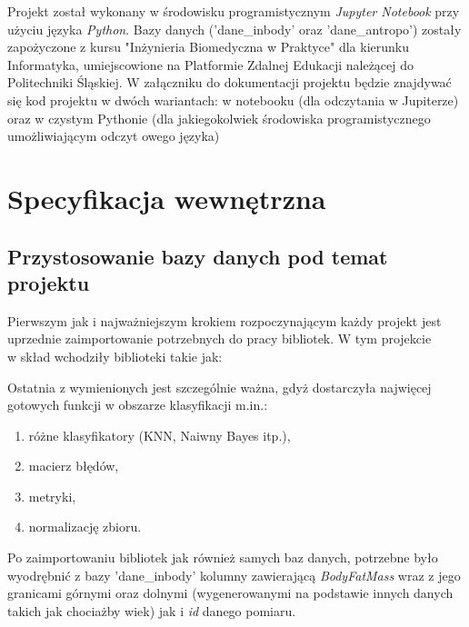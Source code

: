 \documentclass{article}
\begin{document}
Projekt został wykonany w środowisku programistycznym \textit{Jupyter Notebook} przy użyciu języka \textit{Python}. Bazy danych (\textsf{'dane\_inbody' oraz 'dane\_antropo'}) zostały zapożyczone z kursu "Inżynieria Biomedyczna w Praktyce" dla kierunku Informatyka, umiejscowione na Platformie Zdalnej Edukacji należącej do Politechniki Śląskiej. W załączniku do dokumentacji projektu będzie znajdywać się kod projektu w dwóch wariantach: w notebooku (dla odczytania w Jupiterze) oraz w czystym Pythonie (dla jakiegokolwiek środowiska programistycznego umożliwiającym odczyt owego języka)

\newpage

 
 \section{Specyfikacja wewnętrzna}
    \subsection{Przystosowanie bazy danych pod temat projektu}
    Pierwszym jak i najważniejszym krokiem rozpoczynającym każdy projekt jest uprzednie zaimportowanie potrzebnych do pracy bibliotek. W tym projekcie\\w skład wchodziły biblioteki takie jak:
    
    Ostatnia z wymienionych jest szczególnie ważna, gdyż dostarczyła najwięcej gotowych funkcji w obszarze klasyfikacji m.in.:
    \begin{enumerate}
            \item różne klasyfikatory (KNN, Naiwny Bayes itp.),
            \item macierz błędów,
            \item metryki,
            \item normalizację zbioru.
    \end{enumerate}
    Po zaimportowaniu bibliotek jak również samych baz danych, potrzebne było wyodrębnić z bazy \textsf{'dane\_inbody'} kolumny zawierającą \textit{BodyFatMass} wraz z jego granicami górnymi oraz dolnymi (wygenerowanymi na podstawie innych danych takich jak chociażby wiek) jak i \textit{id} danego pomiaru.
    \newpage
    
\end{document}
